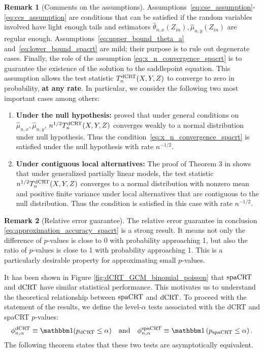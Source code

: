 \documentclass[12pt]{article}
\theoremstyle{definition}
\newtheorem{remark}{Remark}
\newcommand{\indicator}{\mathbbm 1}						%
\newcommand{\srx}{X}									%
\newcommand{\srz}{Z}									%
\newcommand{\sry}{Y}									%
\newcommand{\dCRT}{\textnormal{dCRT}} 					%
\newcommand{\spacrt}{\textnormal{spaCRT}}               %
\begin{document}
\begin{remark}[Comments on the assumptions]
  Assumptions~\eqref{eq:cse_assumption}-\eqref{eq:ccs_assumption} are conditions that can be satisfied if the random variables involved have light enough tails and estimators $\widehat{\theta}_{n,x}(\srz_{in}),\widehat{\mu}_{n,y}(\srz_{in})$ are regular enough. Assumptions~\eqref{eq:upper_bound_theta_a} and~\eqref{eq:lower_bound_spacrt} are mild; their purpose is to rule out degenerate cases. Finally, the role of the assumption \eqref{eq:x_n_convergence_spacrt} is to guarantee the existence of the solution to the saddlepoint equation. This assumption allows the test statistic $T_n^{\dCRT}(\srx,\sry,\srz)$ to converge to zero in probability, \textbf{at any rate}. In particular, we consider the following two most important cases among others:
  \begin{enumerate}
    \item \textbf{Under the null hypothesis:} \citet{Shah2018} proved that under general conditions on $\widehat{\mu}_{n,x},\widehat{\mu}_{n,y}$, $n^{1/2}T_n^{\dCRT}(\srx,\sry,\srz)$ converges weakly to a normal distribution under null hypothesis. Thus the condition~\eqref{eq:x_n_convergence_spacrt} is satisfied under the null hypothesis with rate $n^{-1/2}$.
    \item \textbf{Under contiguous local alternatives:} The proof of Theorem 3 in \citet{Niu2022a} shows that under generalized partially linear models, the test statistic $n^{1/2}T_n^{\dCRT}(\srx,\sry,\srz)$ converges to a normal distribution with nonzero mean and positive finite variance under local alternatives that are contiguous to the null distribution. Thus the condition is satisfied in this case with rate $n^{-1/2}$.
  \end{enumerate}
\end{remark}

\begin{remark}[Relative error guarantee]
	The relative error guarantee in conclusion \eqref{eq:approximation_accuracy_spacrt} is a strong result. It means not only the difference of $p$-values is close to $0$ with probability approaching 1, but also the ratio of $p$-values is close to 1 with probability approaching 1. This is a particularly desirable property for approximating small $p$-values.
\end{remark}

It has been shown in Figure \ref{fig:dCRT_GCM_binomial_poisson} that $\spacrt$ and $\dCRT$ have similar statistical performance. This motivates us to understand the theoretical relationship between $\spacrt$ and $\dCRT$. To proceed with the statement of the results, we define the level-$\alpha$ tests associated with the dCRT and spaCRT $p$-values:
\begin{align*}
\phi^{\dCRT}_{n,\alpha} \equiv \indicator(p_{\dCRT} \leq \alpha) \quad \text{and} \quad	\phi^{\spacrt}_{n,\alpha}\equiv \indicator\left(p_{\spacrt} \leq \alpha\right).
\end{align*}
The following theorem states that these two tests are asymptotically equivalent.
\end{document}
